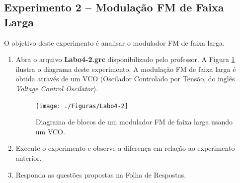 \documentclass[12pt,addpoints]{exam}
\begin{document}

\subsection{Experimento 2 -- Modulação FM de Faixa Larga}

O objetivo deste experimento é analisar o modulador FM de faixa larga. 

\begin{enumerate}
    \item Abra o arquivo \textbf{Labo4-2.grc} disponibilizado pelo professor. A Figura \ref{fig:GRC_4-2} ilustra o diagrama deste experimento. A modulação FM de faixa larga é obtida através de um VCO (Oscilador Controlado por Tensão, do inglês {\it Voltage Control Oscilator}).
    \begin{figure}[htb]
        \centering
        \texttt{[image: ./Figuras/Labo4-2]}
        \caption{Diagrama de blocos de um modulador FM de faixa larga usando um VCO.}
        \label{fig:GRC_4-2}
    \end{figure}
  \item Execute o experimento e observe a diferença em relação ao experimento anterior.
  \item Responda as questões propostas na Folha de Respostas.
\end{enumerate}
\end{document}
